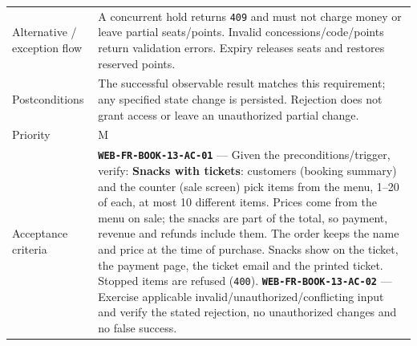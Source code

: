 \begin{longtable}{@{}P{0.23000\SRSWidth}P{0.77000\SRSWidth}@{}}
Alternative /\allowbreak{} exception flow & A concurrent hold returns \texttt{409} and must not charge money or leave partial seats/\allowbreak{}points. Invalid concessions/\allowbreak{}code/\allowbreak{}points return validation errors. Expiry releases seats and restores reserved points. \\[3pt]
Postconditions & The successful observable result matches this requirement; any specified state change is persisted. Rejection does not grant access or leave an unauthorized partial change. \\[3pt]
Priority & M \\[3pt]
Acceptance criteria & \textbf{\texttt{WEB-\allowbreak{}FR-\allowbreak{}BOOK-\allowbreak{}13-\allowbreak{}AC-\allowbreak{}01}} — Given the preconditions/\allowbreak{}trigger, verify: \textbf{Snacks with tickets}: customers (booking summary) and the counter (sale screen) pick items from the menu, 1–20 of each, at most 10 different items. Prices come from the menu on sale; the snacks are part of the total, so payment, revenue and refunds include them. The order keeps the name and price at the time of purchase. Snacks show on the ticket, the payment page, the ticket email and the printed ticket. Stopped items are refused (\texttt{400}). \textbf{\texttt{WEB-\allowbreak{}FR-\allowbreak{}BOOK-\allowbreak{}13-\allowbreak{}AC-\allowbreak{}02}} — Exercise applicable invalid/\allowbreak{}unauthorized/\allowbreak{}conflicting input and verify the stated rejection, no unauthorized changes and no false success. \\[3pt]

\end{longtable}
